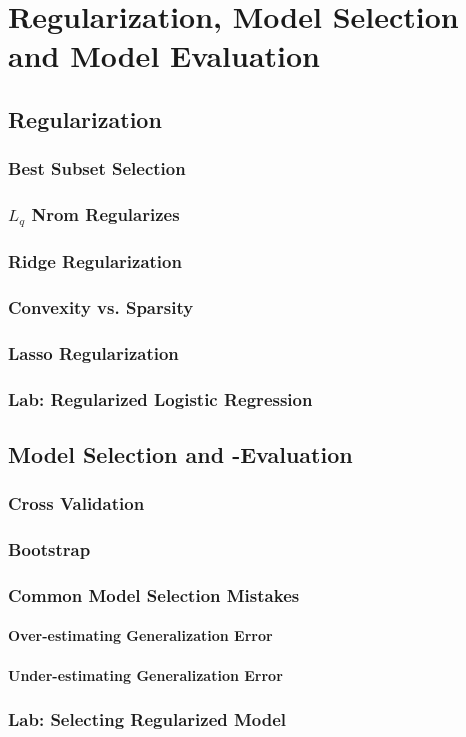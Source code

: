 \chapter{Regularization, Model Selection and Model Evaluation}
    \section{Regularization}
        \subsection{Best Subset Selection}
        \subsection{$L_q$ Nrom Regularizes}
            \subsection{Ridge Regularization}
            \subsection{Convexity vs. Sparsity}
            \subsection{Lasso Regularization}
        \subsection{Lab: Regularized Logistic Regression}
    
    \section{Model Selection and -Evaluation}
        \subsection{Cross Validation}
        \subsection{Bootstrap}
        \subsection{Common Model Selection Mistakes}
            \subsubsection{Over-estimating Generalization Error}
            \subsubsection{Under-estimating Generalization Error}
    \subsection{Lab: Selecting Regularized Model}